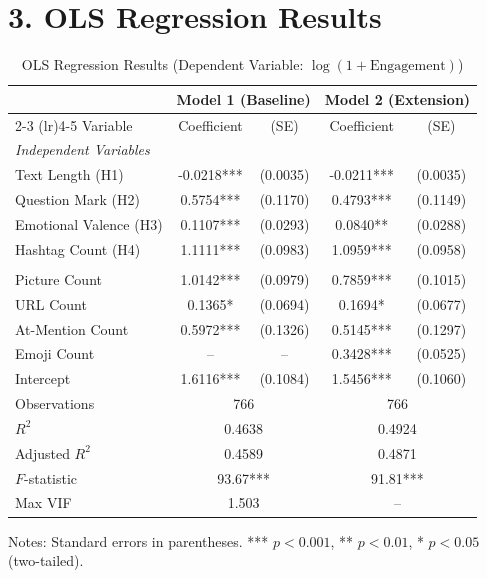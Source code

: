 \documentclass[12pt,a4paper]{article}
\begin{document}
\section*{3. OLS Regression Results}
\begin{table}[h]
\centering
\caption{OLS Regression Results (Dependent Variable: $\log(1+\text{Engagement})$)}
\begin{threeparttable}
\begin{tabular}{lcccc}
\toprule
 & \multicolumn{2}{c}{Model 1 (Baseline)} & \multicolumn{2}{c}{Model 2 (Extension)} \\
\cmidrule(lr){2-3} \cmidrule(lr){4-5}
Variable & Coefficient & (SE) & Coefficient & (SE) \\
\midrule
\multicolumn{5}{l}{\textit{Independent Variables}} \\
Text Length (H1)        & -0.0218*** & (0.0035)& -0.0211***& (0.0035) \\
Question Mark (H2)      & 0.5754***  & (0.1170)& 0.4793*** & (0.1149) \\
Emotional Valence (H3)  & 0.1107***  & (0.0293)& 0.0840**  & (0.0288) \\
Hashtag Count (H4)      & 1.1111***  & (0.0983)& 1.0959*** & (0.0958) \\
\addlinespace
\multicolumn{5}{l}{\textit{Control / Extension Variables}} \\
Picture Count           & 1.0142***  & (0.0979)& 0.7859*** & (0.1015) \\
URL Count               & 0.1365*    & (0.0694)& 0.1694*   & (0.0677) \\
At-Mention Count        & 0.5972***  & (0.1326)& 0.5145*** & (0.1297) \\
Emoji Count             & --         & --      & 0.3428*** & (0.0525) \\
\addlinespace
Intercept               & 1.6116***  & (0.1084)& 1.5456*** & (0.1060) \\
\midrule
Observations            & \multicolumn{2}{c}{766} & \multicolumn{2}{c}{766} \\
$R^2$                   & \multicolumn{2}{c}{0.4638} & \multicolumn{2}{c}{0.4924} \\
Adjusted $R^2$          & \multicolumn{2}{c}{0.4589} & \multicolumn{2}{c}{0.4871} \\
$F$-statistic           & \multicolumn{2}{c}{93.67***} & \multicolumn{2}{c}{91.81***} \\
Max VIF                 & \multicolumn{2}{c}{1.503} & \multicolumn{2}{c}{--} \\
\bottomrule
\end{tabular}
\begin{tablenotes}
\small
\item Notes: Standard errors in parentheses. *** $p < 0.001$, ** $p < 0.01$, * $p < 0.05$ (two-tailed).
\end{tablenotes}
\end{threeparttable}
\end{table}
\end{document}
